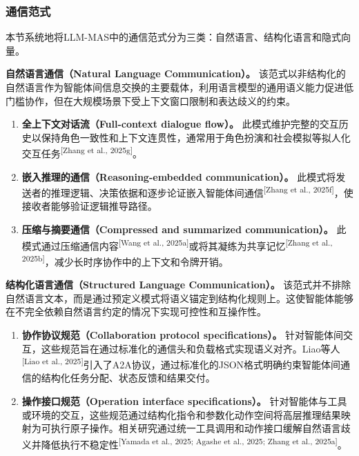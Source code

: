 \documentclass[UTF8,a4paper,12pt]{article}
\begin{document}
\subsubsection{通信范式}

本节系统地将LLM-MAS中的通信范式分为三类：自然语言、结构化语言和隐式向量。

\textbf{自然语言通信（Natural Language Communication）。} 该范式以非结构化的自然语言作为智能体间信息交换的主要载体，利用语言模型的通用语义能力促进低门槛协作，但在大规模场景下受上下文窗口限制和表达歧义的约束。

\begin{enumerate}
    \item \textbf{全上下文对话流（Full-context dialogue flow）。} 此模式维护完整的交互历史以保持角色一致性和上下文连贯性，通常用于角色扮演和社会模拟等拟人化交互任务\textsuperscript{[Zhang et al., 2025g]}。
    
    \item \textbf{嵌入推理的通信（Reasoning-embedded communication）。} 此模式将发送者的推理逻辑、决策依据和逐步论证嵌入智能体间通信\textsuperscript{[Zhang et al., 2025f]}，使接收者能够验证逻辑推导路径。
    
    \item \textbf{压缩与摘要通信（Compressed and summarized communication）。} 此模式通过压缩通信内容\textsuperscript{[Wang et al., 2025a]}或将其凝练为共享记忆\textsuperscript{[Zhang et al., 2025b]}，减少长时序协作中的上下文和令牌开销。
\end{enumerate}

\textbf{结构化语言通信（Structured Language Communication）。} 该范式并不排除自然语言文本，而是通过预定义模式将语义锚定到结构化规则上。这使智能体能够在不完全依赖自然语言约定的情况下实现可控性和互操作性。

\begin{enumerate}
    \item \textbf{协作协议规范（Collaboration protocol specifications）。} 针对智能体间交互，这些规范旨在通过标准化的通信头和负载格式实现语义对齐。Liao等人\textsuperscript{[Liao et al., 2025]}引入了A2A协议，通过标准化的JSON格式明确约束智能体间通信的结构化任务分配、状态反馈和结果交付。
    
    \item \textbf{操作接口规范（Operation interface specifications）。} 针对智能体与工具或环境的交互，这些规范通过结构化指令和参数化动作空间将高层推理结果映射为可执行原子操作。相关研究通过统一工具调用和动作接口缓解自然语言歧义并降低执行不稳定性\textsuperscript{[Yamada et al., 2025; Agashe et al., 2025; Zhang et al., 2025a]}。
\end{enumerate}
\end{document}
